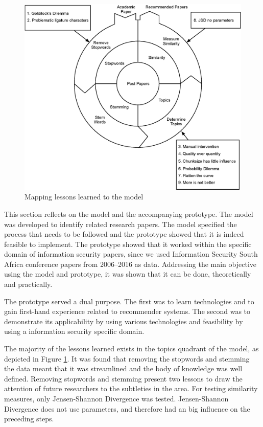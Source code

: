 \begin{figure}[htbp]
\centering
\includegraphics[width=15cm]{./figures/Lesson77.eps}
\caption{Mapping lessons learned to the model}
\label{fig:processing1}
\end{figure}

This section reflects on the model and the accompanying prototype. The model was developed to identify related research papers. The model specified the process that needs to be followed and the prototype showed that it is indeed feasible to implement. The prototype showed that it worked within the specific domain of information security papers, since we used Information Security South Africa conference papers from 2006–2016 as data. Addressing the main objective using the model and prototype, it was shown that it can be done, theoretically and practically.

The prototype served a dual purpose. The first was to learn technologies and to gain first-hand experience related to recommender systems. The second was to demonstrate its applicability by using various technologies and feasibility by using a information security specific domain. 

The majority of the lessons learned exists in the topics quadrant of the model, as depicted in Figure \ref{fig:processing1}. It was found that removing the stopwords and stemming the data meant that it was streamlined and the body of knowledge was well defined. Removing stopwords and stemming present two lessons to draw the attention of future researchers to the subtleties in the area. For testing similarity measures, only Jensen-Shannon Divergence was tested. Jensen-Shannon Divergence does not use parameters, and therefore had an big influence on the preceding steps.

